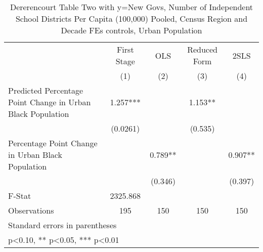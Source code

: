 \begin{table}[htbp]\centering
\def\sym#1{\ifmmode^{#1}\else\(^{#1}\)\fi}
\caption{Dererencourt Table Two with y=New Govs, Number of Independent School Districts Per Capita (100,000) Pooled, Census Region and Decade FEs controls, Urban Population}
\begin{tabular}{l*{4}{c}}
\toprule
                    & First Stage   &         OLS   &Reduced Form   &        2SLS   \\
                    &\multicolumn{1}{c}{(1)}   &\multicolumn{1}{c}{(2)}   &\multicolumn{1}{c}{(3)}   &\multicolumn{1}{c}{(4)}   \\
\midrule
Predicted Percentage Point Change in Urban Black Population&       1.257***&               &       1.153** &               \\
                    &    (0.0261)   &               &     (0.535)   &               \\
\addlinespace
Percentage Point Change in Urban Black Population&               &       0.789** &               &       0.907** \\
                    &               &     (0.346)   &               &     (0.397)   \\
\midrule
F-Stat              &    2325.868   &               &               &               \\
Observations        &         195   &         150   &         150   &         150   \\
\bottomrule
\multicolumn{5}{l}{\footnotesize Standard errors in parentheses}\\
\multicolumn{5}{l}{\footnotesize * p<0.10, ** p<0.05, *** p<0.01}\\
\end{tabular}
\end{table}
